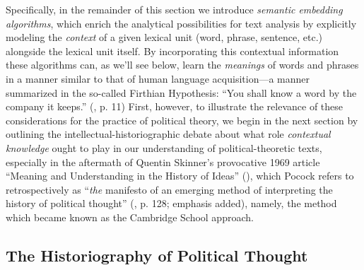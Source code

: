 \documentclass[11pt]{article}
\begin{document}
Specifically, in the remainder of this section we introduce \textit{semantic embedding algorithms}, which enrich the analytical possibilities for text analysis by explicitly modeling the \textit{context} of a given lexical unit (word, phrase, sentence, etc.) alongside the lexical unit itself. By incorporating this contextual information these algorithms can, as we'll see below, learn the \textit{meanings} of words and phrases in a manner similar to that of human language acquisition---a manner summarized in the so-called Firthian Hypothesis: ``You shall know a word by the company it keeps.'' (\cite{firth_papers_1957}, p. 11) First, however, to illustrate the relevance of these considerations for the practice of political theory, we begin in the next section by outlining the intellectual-historiographic debate about what role \textit{contextual knowledge} ought to play in our understanding of political-theoretic texts, especially in the aftermath of Quentin Skinner's provocative 1969 article ``Meaning and Understanding in the History of Ideas'' (\cite{skinner_meaning_1969}), which Pocock refers to retrospectively as ``\textit{the} manifesto of an emerging method of interpreting the history of political thought'' (\cite{pocock_political_2009}, p. 128; emphasis added), namely, the method which became known as the Cambridge School approach.
	
	
\subsection{The Historiography of Political Thought}\label{sec:methods-hpt}
	
\end{document}
